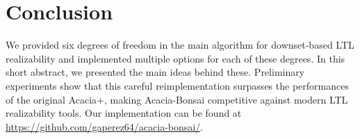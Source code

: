 \documentclass[sigconf,screen,nonacm]{acmart}
\begin{document}
\section{Conclusion}

We provided six degrees of freedom in the main algorithm for downset-based LTL
realizability and implemented multiple options for each of these degrees.  In
this short abstract, we presented the main ideas behind these.  Preliminary
experiments show that this careful reimplementation surpasses the performances
of the original Acacia+, making Acacia-Bonsai competitive against modern LTL
realizability tools.  Our implementation can be found at
\url{https://github.com/gaperez64/acacia-bonsai/}.



\end{document}
